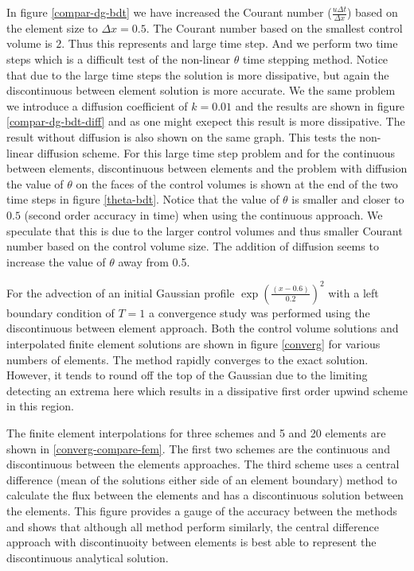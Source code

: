 In figure \ref{compar-dg-bdt} we have increased the Courant number ($\frac{u \Delta t}{\Delta x}$)  based on the 
element size to ${\Delta x}=0.5$. The Courant number based on the smallest 
control volume is $2$. Thus this represents and large time step. 
And we perform two time steps which is a difficult test 
of the non-linear $\theta$ time stepping method. 
Notice that due to the large time 
steps the solution is more dissipative, but again the 
discontinuous between element solution is more accurate. 
We the same problem we introduce a diffusion coefficient 
of $k=0.01$ and the results are shown in figure 
\ref{compar-dg-bdt-diff} and 
as one might exepect this result is more dissipative. 
The result without diffusion is also shown on the same graph. 
This tests the non-linear diffusion scheme. 
For this large time step problem and for the continuous between 
elements, discontinuous between elements and the problem with diffusion 
the value of $\theta$ on the faces of the control volumes is shown 
at the end of the two time steps in figure \ref{theta-bdt}. 
Notice that the value of $\theta$ is smaller and closer to $0.5$ 
(second order accuracy in time) when using the continuous approach. 
We speculate that this is due to the larger control volumes and 
thus smaller Courant number based on the control volume size. 
The addition of diffusion seems to increase the value of $\theta$ 
away from 0.5. 

For the advection of an initial Gaussian 
profile $\exp{( \frac{(x-0.6)}{0.2} )^2}$ 
with a left boundary condition of $T=1$ a convergence study was performed using 
the discontinuous between element approach. Both the 
control volume solutions and interpolated finite element solutions 
are shown in figure \ref{converg} for various numbers of elements. 
The method rapidly converges to the exact solution. However, it tends 
to round off the top of the Gaussian due to the limiting detecting an 
extrema here which results in a dissipative first order upwind scheme 
in this region. 

The finite element interpolations for three schemes and 
5 and 20 elements are shown in \ref{converg-compare-fem}. 
The first two schemes are the continuous and discontinuous between 
the elements approaches. 
The third scheme uses a central difference (mean of the solutions 
either side of an element boundary) method to calculate the 
flux between the elements and has a discontinuous solution between 
the elements. This figure provides a gauge of the accuracy between 
the methods and shows that although all method perform similarly, 
the central difference approach with discontinuoity between 
elements is best able to represent the discontinuous analytical solution. 


